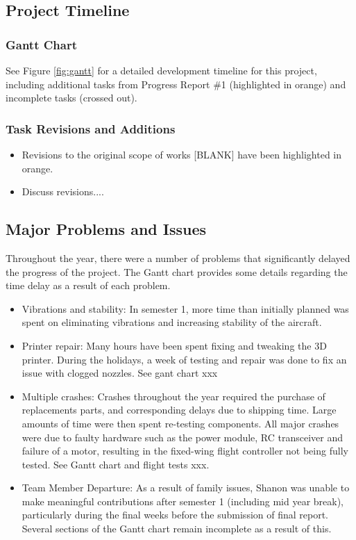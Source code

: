 \subsection{Project Timeline}
\subsubsection*{Gantt Chart}
\label{sec:gantt}
See Figure \ref{fig:gantt} for a detailed development timeline for this project, including additional tasks from Progress Report \#1 (highlighted in orange) and incomplete tasks (crossed out). 

\subsubsection*{Task Revisions and Additions}

\begin{itemize}
	\item Revisions to the original scope of works [BLANK] have been highlighted in orange.
	
	\item Discuss revisions....
	
\end{itemize}

\subsection{Major Problems and Issues}
Throughout the year, there were a number of problems that significantly delayed the progress of the project. The Gantt chart provides some details regarding the time delay as a result of each problem.
\begin{itemize}
	\item Vibrations and stability: In semester 1, more time than initially planned was spent on eliminating vibrations and increasing stability of the aircraft. 
	
	\item Printer repair: Many hours have been spent fixing and tweaking the 3D printer.  During the holidays, a week of testing and repair was done to fix an issue with clogged nozzles. See gant chart xxx
	
	\item Multiple crashes: Crashes throughout the year required the purchase of replacements parts, and corresponding delays due to shipping time. Large amounts of time were then spent re-testing components. All major crashes were due to faulty hardware such as the power module, RC transceiver and failure of a motor, resulting in the fixed-wing flight controller not being fully tested. See Gantt chart and flight tests xxx.
	
	\item Team Member Departure: As a result of family issues, Shanon was unable to make meaningful contributions after semester 1 (including mid year break), particularly during the final weeks before the submission of final report. Several sections of the Gantt chart remain incomplete as a result of this.
\end{itemize}


